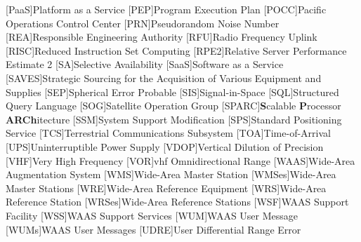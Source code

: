 \begin{acronym}[WAAS]
[PaaS]{Platform as a Service}
[PEP]{Program Execution Plan}
[POCC]{Pacific Operations Control Center}
[PRN]{Pseudorandom Noise Number}
[REA]{Responsible Engineering Authority}
[RFU]{Radio Frequency Uplink}
[RISC]{Reduced Instruction Set Computing}
[RPE2]{Relative Server Performance Estimate 2}
[SA]{Selective Availability}
[SaaS]{Software as a Service}
[SAVES]{Strategic Sourcing for the Acquisition of Various Equipment and Supplies}
[SEP]{Spherical Error Probable}
[SIS]{Signal-in-Space}
[SQL]{Structured Query Language}
[SOG]{Satellite Operation Group}
[SPARC]{\textbf{S}calable \textbf{P}rocessor \textbf{ARCh}itecture}
[SSM]{System Support Modification}
[SPS]{Standard Positioning Service}
[TCS]{Terrestrial Communications Subsystem}
[TOA]{Time-of-Arrival}
[UPS]{Uninterruptible Power Supply}
[VDOP]{Vertical Dilution of Precision}
[VHF]{Very High Frequency}
[VOR]{\ac{vhf} Omnidirectional Range}
[WAAS]{Wide-Area Augmentation System}
[WMS]{Wide-Area Master Station}
[WMSes]{Wide-Area Master Stations}
[WRE]{Wide-Area Reference Equipment}
[WRS]{Wide-Area Reference Station}
[WRSes]{Wide-Area Reference Stations}
[WSF]{WAAS Support Facility}
[WSS]{WAAS Support Services}
[WUM]{WAAS User Message}
[WUMs]{WAAS User Messages}
[UDRE]{User Differential Range Error}
\end{acronym}
